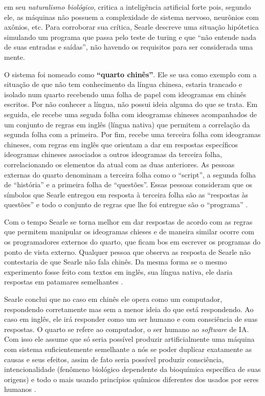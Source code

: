 \documentclass[
  openany]{book}
\begin{document}
\citet{searle1980minds} em seu \emph{naturalismo biológico}, critica a inteligência artificial forte pois, segundo ele, as máquinas não possuem a complexidade de sistema nervoso, neurônios com axônios, etc. Para corroborar sua crítica, Searle descreve uma situação hipótetica simulando um programa que passa pelo teste de turing e que ``não entende nada de suas entradas e saídas'', não havendo os requisitos para ser considerada uma mente.

O sistema foi nomeado como \textbf{``quarto chinês''}. Ele se usa como exemplo com a situação de que não tem conhecimento da língua chinesa, estaria trancado e isolado num quarto recebendo uma folha de papel com ideogramas em chinês escritos. Por não conhecer a língua, não possui ideia alguma do que se trata. Em seguida, ele recebe uma seguda folha com ideogramas chineses acompanhados de um conjunto de regras em inglês (língua nativa) que permitem a correlação da segunda folha com a primeira. Por fim, recebe uma terceira folha com ideogramas chineses, com regras em inglês que orientam a dar em respostas específicos ideogramas chineses associados a outros ideogramas da terceira folha, correlacionando os elementos da atual com as duas anteriores. As pessoas externas do quarto denominam a terceira folha como o ``script'', a segunda folha de ``história'' e a primeira folha de ``questões''. Essas pessoas consideram que os símbolos que Searle entregou em resposta à terceira folha são as ``respostas às questões'' e todo o conjunto de regras que lhe foi entregue são o ``programa'' \citep{guimaraes2019inteligencia}.

Com o tempo Searle se torna melhor em dar respostas de acordo com as regras que permitem manipular os ideogramas chieses e de maneira similar ocorre com os programadores externos do quarto, que ficam bos em escrever os programas do ponto de vista externo. Qualquer pessoa que observa as resposta de Searle não contestaria de que Searle não fala chinês. Da mesma forma se o mesmo experimento fosse feito com textos em inglês, sua língua nativa, ele daria respostas em patamares semelhantes \citep{guimaraes2019inteligencia}.

Searle conclui que no caso em chinês ele opera como um computador, respondendo corretamente mas sem a menor ideia do que está respondendo. Ao caso em inglês, ele irá responder como um ser humano e com consciência de suas respostas. O quarto se refere ao computador, o ser humano ao \emph{software} de IA. Com isso ele assume que só seria possível produzir artificialmente uma máquina com sistema suficientemente semelhante a nós se poder duplicar exatamente as causas e seus efeitos, assim de fato seria possível produzir consciência, intencionalidade (fenômeno biológico dependente da
bioquímica específica de suas origens) e todo o mais usando princípios químicos diferentes dos usados por seres humanos \citep{searle1980minds} .
\end{document}
